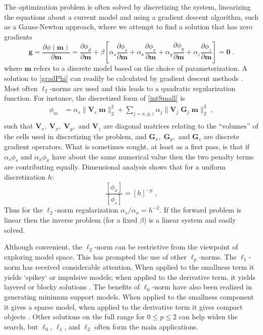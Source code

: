\documentclass[extra,referee]{gji}
\begin{document}
The optimization problem is often solved by discretizing the system, linearizing the equations about a current model and using a gradient descent algorithm, such as a Gauss-Newton approach, where we attempt to find a solution that has zero gradients
\begin{equation}\label{gradPhi}
\mathbf{g} = \frac{\partial \phi(\mathbf{m})}{\partial \mathbf{m}} = \frac{\partial \phi_d}{\partial \mathbf{m}} + \beta \left[ \alpha_s \frac{\partial \phi_s}{\partial \mathbf{m}} + \alpha_x \frac{\partial \phi_x}{\partial \mathbf{m}} + \alpha_y \frac{\partial \phi_y}{\partial \mathbf{m}} + \alpha_z \frac{\partial \phi_z}{\partial \mathbf{m}} \right] = \mathbf{0} \;.
\end{equation}
where $\mathbf{m}$ refers to a discrete model based on the choice of parameterization.
A solution to \eqref{gradPhi} can readily be calculated by gradient descent methods \cite[]{HestenesStiefel1952, NocedalWright99}.
Most often $\ell_2$-norms are used and this leads to a quadratic regularization function. For instance, the discretized form of \eqref{intSmall} is
\begin{equation}\label{leastSquaresLin}
\begin{split}
\phi_m &= \alpha_s \|\mathbf{V}_s \;\mathbf{m}\|_2^2 + \sum_{j=x,y,z} \alpha_j \|\mathbf{V}_j \;\mathbf{G}_j \;\mathbf{m}\|_2^2 \;,\\
\end{split}
\end{equation}
such that $\mathbf{V}_s,\;\mathbf{V}_x,\;\mathbf{V}_y,$ and $\mathbf{V}_z$ are diagonal matrices relating to the “volumes” of the cells used in discretizing the problem, and
$\mathbf{G}_x,\;\mathbf{G}_y,$ and $\mathbf{G}_z$ are discrete gradient operators. What is sometimes sought, at least as a first pass, is that if $\alpha_s \phi_s$ and $\alpha_x \phi_x$ have about the same numerical value then the two penalty terms are contributing equally. Dimensional analysis shows that for a uniform discretization $h$:
\begin{equation}\label{lengthScale}
\frac{[\phi_x] }{ [\phi_s]} = {[h]}^{-p}\;,
\end{equation}
Thus for the $\ell_2$-norm regularization $\alpha_s/\alpha_x = h^{-2}$.
If the forward problem is linear then the inverse problem (for a fixed $\beta$) is a linear system and easily solved.

Although convenient, the $\ell_2$-norm can be restrictive from the viewpoint of exploring model space. This has prompted the use of other $\ell_p$-norms. The $\ell_1$-norm has received considerable attention. When applied to the smallness term it yields `spikey` or impulsive models; when applied to the derivative term, it yields layered or blocky solutions \cite[]{Li93, FarquharsonOldenburg98, Daubechies10}. The benefits of $\ell_0$-norm have also been realized in generating minimum support models. When applied to the smallness component it gives a sparse model, when applied to the derivative term it gives compact objects \cite[]{Portniaguine1999, LastKubik83,BarbosaSilva94, Ajo-Franklin07}. Other solutions on the full range for $0\leq p\leq 2$ can help widen the search, but $\ell_0$, $\ell_1$, and $\ell_2$ often form the main applications.
\end{document}
